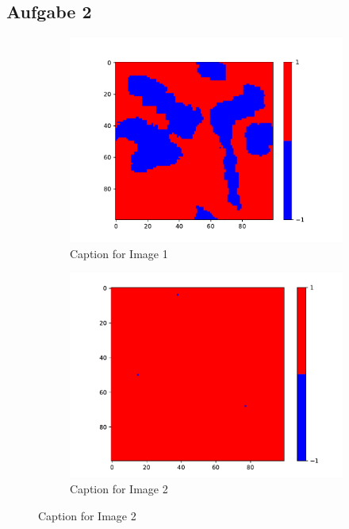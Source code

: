 \subsection{Aufgabe 2} 

\begin{figure}
    \centering
    \begin{subfigure}{0.45\textwidth}
      \centering
      \includegraphics[width=\linewidth]{images/Ising1_0.pdf}
      \caption{Caption for Image 1}
      \label{fig:image1}
    \end{subfigure}
    \hfill
    \begin{subfigure}{0.45\textwidth}
      \centering
      \includegraphics[width=\linewidth]{images/Ising1_2.pdf}
      \caption{Caption for Image 2}
      \label{fig:image2}
    \end{subfigure}
    

\end{figure}
